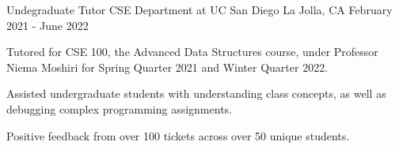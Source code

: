 
\begin{cventries}
    \cventry
      {Undegraduate Tutor}
      {CSE Department at UC San Diego}
      {La Jolla, CA}
      {February 2021 - June 2022}
      {
        \begin{cvitems}
          \item {Tutored for CSE 100, the Advanced Data Structures course, under Professor Niema Moshiri for Spring Quarter 2021 and Winter Quarter 2022.}
          \item {Assisted undergraduate students with understanding class concepts, as well as debugging complex programming assignments.}
          \item {Positive feedback from over 100 tickets across over 50 unique students.}
        \end{cvitems}
      }
\end{cventries}
